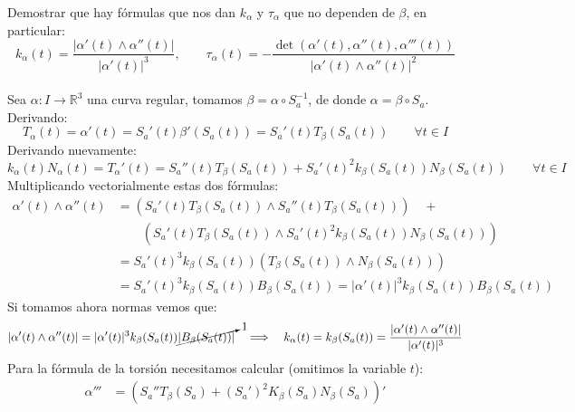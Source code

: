 \begin{ejercicio} %
    Demostrar que hay fórmulas que nos dan $k_\alpha$ y $\tau_\alpha$ que no dependen de $\beta$, en particular:
    \begin{equation*}
        k_\alpha(t) = \frac{|\alpha'(t)\land \alpha''(t)|}{|\alpha'(t)|^3}, \qquad \tau_\alpha(t) = -\frac{\det(\alpha'(t),\alpha''(t), \alpha'''(t))}{|\alpha'(t)\land \alpha''(t)|^2}
    \end{equation*}~\\

    \noindent
    Sea $\alpha:I\to\mathbb{R}^3$ una curva regular, tomamos $\beta = \alpha\circ S_a^{-1}$, de donde $\alpha = \beta\circ S_a$. Derivando:
    \begin{equation*}
        T_\alpha(t) = \alpha'(t) = S_a'(t)\beta'(S_a(t)) = S_a'(t)T_\beta(S_a(t)) \qquad \forall t\in I
    \end{equation*}
    Derivando nuevamente:
    \begin{equation*}
        k_\alpha(t)N_\alpha(t) = T_\alpha'(t) = S_a''(t)T_\beta(S_a(t)) + S_a'(t)^2 k_\beta(S_a(t))N_\beta(S_a(t)) \qquad \forall t\in I
    \end{equation*}
    Multiplicando vectorialmente estas dos fórmulas:
    \begin{align*}
        \alpha'(t)\land \alpha''(t) &= (S_a'(t)T_\beta(S_a(t)) \land S_a''(t)T_\beta(S_a(t)))\quad  + \\
                                    &\qquad (S_a'(t)T_\beta(S_a(t))\land S_a'(t)^2k_\beta(S_a(t))N_\beta(S_a(t))) \\
                                    &= S_a'(t)^3k_\beta(S_a(t)) (T_\beta(S_a(t))\land N_\beta(S_a(t))) \\
                                    &= S_a'(t)^3k_\beta(S_a(t))B_\beta(S_a(t)) = |\alpha'(t)|^3 k_\beta(S_a(t))B_\beta(S_a(t))
    \end{align*}
    Si tomamos ahora normas vemos que:
    \begin{equation*}
        |\alpha'(t)\land \alpha''(t)| = |\alpha'(t)|^3 k_\beta(S_a(t)) \cancelto{1}{|B_\beta(S_a(t))|} \quad\Longrightarrow\quad k_\alpha(t) = k_\beta(S_a(t)) = \frac{|\alpha'(t)\land \alpha''(t)|}{|\alpha'(t)|^3}
    \end{equation*}
    Para la fórmula de la torsión necesitamos calcular (omitimos la variable $t$):
    \begin{align*}
        \alpha''' &= \left(S_a''T_\beta(S_a) + {(S_a')}^{2}K_\beta(S_a)N_\beta(S_a)\right)' \\

\end{align*}
\end{ejercicio}
